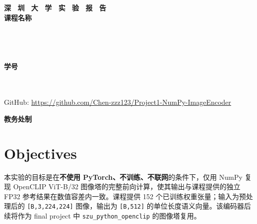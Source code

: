 \documentclass[a4paper,12pt]{article}
\newcommand{\code}[1]{\texttt{\small #1}}
\begin{document}
\begin{titlepage}
    \centering
    \vspace*{2cm}
    \Huge{\textbf{深 \ 圳 \ 大 \ 学 \ 实 \ 验 \ 报 \ 告}}\\[1.5cm]

    {\Large\textbf{课程名称}\quad\underline{}}\\[0.5cm]
    {\Large
    \noindent{}
    \underline{}}\\[0.5cm]
    {\Large
    \noindent{}
    \underline{}}\\[0.5cm]
    {\Large
    \noindent{}
    \underline{}}\\[0.5cm]
    {\Large
    \noindent{}
    \underline{}}\\[0.5cm]
    {\Large
    \noindent{}
    \underline{}
    \hspace{0.5cm}
    \textbf{学号}
    \underline{}}\\[0.5cm]
    {\Large
    \noindent{}
    \underline{}}\\[0.5cm]
    {\Large
    \noindent{}
    \underline{}}\\[1.2cm]

    {\normalsize GitHub: \url{https://github.com/Chen-zzz123/Project1-NumPy-ImageEncoder}\par}
    \vfill
    \Large{\textbf{教务处制}}
\end{titlepage}

\newpage

\section{Objectives}

本实验的目标是在\textbf{不使用 PyTorch、不训练、不联网}的条件下，仅用 NumPy 复现 OpenCLIP ViT-B/32 图像塔的完整前向计算，使其输出与课程提供的独立 FP32 参考结果在数值容差内一致。课程提供 152 个已训练权重张量；输入为预处理后的 \code{[B,3,224,224]} 图像，输出为 \code{[B,512]} 的单位长度语义向量。该编码器后续将作为 final project 中 \code{szu\_python\_openclip} 的图像塔复用。
\end{document}
